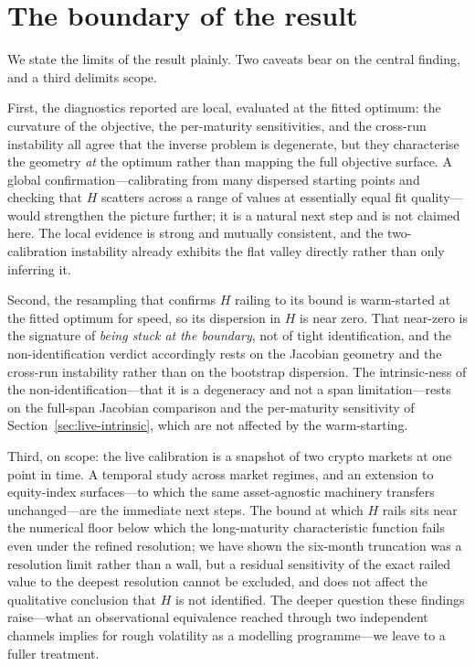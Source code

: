 \documentclass[11pt,a4paper]{article}
\numberwithin{equation}{section}
\begin{document}
\section{The boundary of the result}\label{sec:limitations}

We state the limits of the result plainly. Two caveats bear on the central finding, and a third
delimits scope.

First, the diagnostics reported are local, evaluated at the fitted optimum: the curvature of the
objective, the per-maturity sensitivities, and the cross-run instability all agree that the inverse
problem is degenerate, but they characterise the geometry \emph{at} the optimum rather than mapping the full
objective surface. A global confirmation---calibrating from many dispersed starting points and
checking that $H$ scatters across a range of values at essentially equal fit quality---would
strengthen the picture further; it is a natural next step and is not claimed here. The local evidence
is strong and mutually consistent, and the two-calibration instability already exhibits the flat
valley directly rather than only inferring it.

Second, the resampling that confirms $H$ railing to its bound is warm-started at the fitted optimum for
speed, so its dispersion in $H$ is near zero. That near-zero is the signature of \emph{being stuck at
the boundary}, not of tight identification, and the non-identification verdict accordingly rests on the
Jacobian geometry and the cross-run instability rather than on the bootstrap dispersion. The
intrinsic-ness of the non-identification---that it is a degeneracy and not a span limitation---rests on
the full-span Jacobian comparison and the per-maturity sensitivity of Section~\ref{sec:live-intrinsic},
which are not affected by the warm-starting.

Third, on scope: the live calibration is a snapshot of two crypto markets at one point in time. A
temporal study across market regimes, and an extension to equity-index surfaces---to which the same
asset-agnostic machinery transfers unchanged---are the immediate next steps. The bound at which $H$
rails sits near the numerical floor below which the long-maturity characteristic function fails even
under the refined resolution; we have shown the six-month truncation was a resolution limit rather than
a wall, but a residual sensitivity of the exact railed value to the deepest resolution cannot be
excluded, and does not affect the qualitative conclusion that $H$ is not identified. The deeper
question these findings raise---what an observational equivalence reached through two independent
channels implies for rough volatility as a modelling programme---we leave to a fuller treatment.
\end{document}
